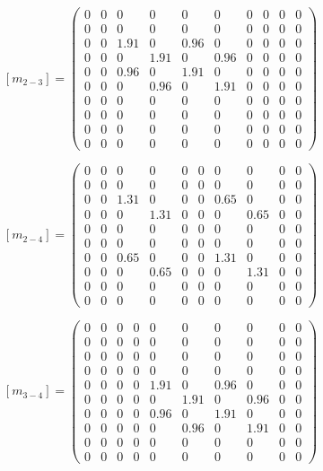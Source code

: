 \documentclass[12pt, a4papper, twoside]{article}
\begin{document}
 $$ [m_{2-3}] = \left(\begin{array}{cccccccccc} 0 & 0 & 0 & 0 & 0 & 0 & 0 & 0 & 0 & 0\\ 0 & 0 & 0 & 0 & 0 & 0 & 0 & 0 & 0 & 0\\ 0 & 0 & 1.91 & 0 & 0.96 & 0 & 0 & 0 & 0 & 0\\ 0 & 0 & 0 & 1.91 & 0 & 0.96 & 0 & 0 & 0 & 0\\ 0 & 0 & 0.96 & 0 & 1.91 & 0 & 0 & 0 & 0 & 0\\ 0 & 0 & 0 & 0.96 & 0 & 1.91 & 0 & 0 & 0 & 0\\ 0 & 0 & 0 & 0 & 0 & 0 & 0 & 0 & 0 & 0\\ 0 & 0 & 0 & 0 & 0 & 0 & 0 & 0 & 0 & 0\\ 0 & 0 & 0 & 0 & 0 & 0 & 0 & 0 & 0 & 0\\ 0 & 0 & 0 & 0 & 0 & 0 & 0 & 0 & 0 & 0 \end{array}\right) $$


  $$ [m_{2-4}] = \left(\begin{array}{cccccccccc} 0 & 0 & 0 & 0 & 0 & 0 & 0 & 0 & 0 & 0\\ 0 & 0 & 0 & 0 & 0 & 0 & 0 & 0 & 0 & 0\\ 0 & 0 & 1.31 & 0 & 0 & 0 & 0.65 & 0 & 0 & 0\\ 0 & 0 & 0 & 1.31 & 0 & 0 & 0 & 0.65 & 0 & 0\\ 0 & 0 & 0 & 0 & 0 & 0 & 0 & 0 & 0 & 0\\ 0 & 0 & 0 & 0 & 0 & 0 & 0 & 0 & 0 & 0\\ 0 & 0 & 0.65 & 0 & 0 & 0 & 1.31 & 0 & 0 & 0\\ 0 & 0 & 0 & 0.65 & 0 & 0 & 0 & 1.31 & 0 & 0\\ 0 & 0 & 0 & 0 & 0 & 0 & 0 & 0 & 0 & 0\\ 0 & 0 & 0 & 0 & 0 & 0 & 0 & 0 & 0 & 0 \end{array}\right) $$

 $$ [m_{3-4}] = \left(\begin{array}{cccccccccc} 0 & 0 & 0 & 0 & 0 & 0 & 0 & 0 & 0 & 0\\ 0 & 0 & 0 & 0 & 0 & 0 & 0 & 0 & 0 & 0\\ 0 & 0 & 0 & 0 & 0 & 0 & 0 & 0 & 0 & 0\\ 0 & 0 & 0 & 0 & 0 & 0 & 0 & 0 & 0 & 0\\ 0 & 0 & 0 & 0 & 1.91 & 0 & 0.96 & 0 & 0 & 0\\ 0 & 0 & 0 & 0 & 0 & 1.91 & 0 & 0.96 & 0 & 0\\ 0 & 0 & 0 & 0 & 0.96 & 0 & 1.91 & 0 & 0 & 0\\ 0 & 0 & 0 & 0 & 0 & 0.96 & 0 & 1.91 & 0 & 0\\ 0 & 0 & 0 & 0 & 0 & 0 & 0 & 0 & 0 & 0\\ 0 & 0 & 0 & 0 & 0 & 0 & 0 & 0 & 0 & 0 \end{array}\right) $$
\end{document}
